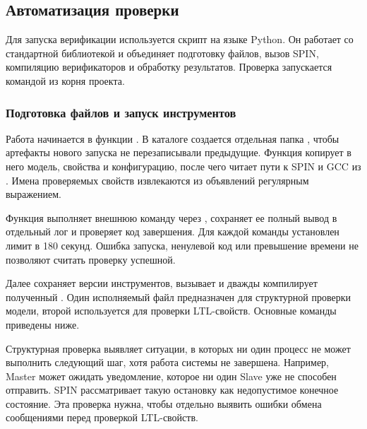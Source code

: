\subsection{Автоматизация проверки}

Для запуска верификации используется скрипт  на языке Python.
Он работает со стандартной библиотекой и объединяет подготовку файлов,
вызов SPIN, компиляцию верификаторов и обработку результатов. Проверка
запускается командой  из корня проекта.

\subsubsection{Подготовка файлов и запуск инструментов}

Работа начинается в функции . В каталоге
 создается отдельная папка ,
чтобы артефакты нового запуска не перезаписывали предыдущие.
Функция  копирует
в него модель, свойства и конфигурацию, после чего читает пути к SPIN
и GCC из . Имена проверяемых свойств извлекаются
из объявлений  регулярным выражением.


Функция  выполняет внешнюю команду через ,
сохраняет ее полный вывод в отдельный лог и проверяет код завершения.
Для каждой команды установлен лимит в 180 секунд. Ошибка запуска,
ненулевой код или превышение времени не позволяют считать проверку
успешной.

Далее  сохраняет версии инструментов, вызывает
 и дважды компилирует полученный .
Один исполняемый файл предназначен для структурной проверки модели,
второй используется для проверки LTL-свойств. Основные команды приведены ниже.


Структурная проверка выявляет ситуации, в которых ни один процесс
не может выполнить следующий шаг, хотя работа системы не завершена.
Например, Master может ожидать уведомление, которое ни один Slave
уже не способен отправить. SPIN рассматривает такую остановку
как недопустимое конечное состояние. Эта проверка нужна, чтобы отдельно
выявить ошибки обмена сообщениями перед проверкой LTL-свойств.

